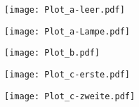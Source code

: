

\pagestyle{empty}



\texttt{[image: Plot\_a-leer.pdf]}

\texttt{[image: Plot\_a-Lampe.pdf]}

\texttt{[image: Plot\_b.pdf]}

\texttt{[image: Plot\_c-erste.pdf]}

\texttt{[image: Plot\_c-zweite.pdf]}



